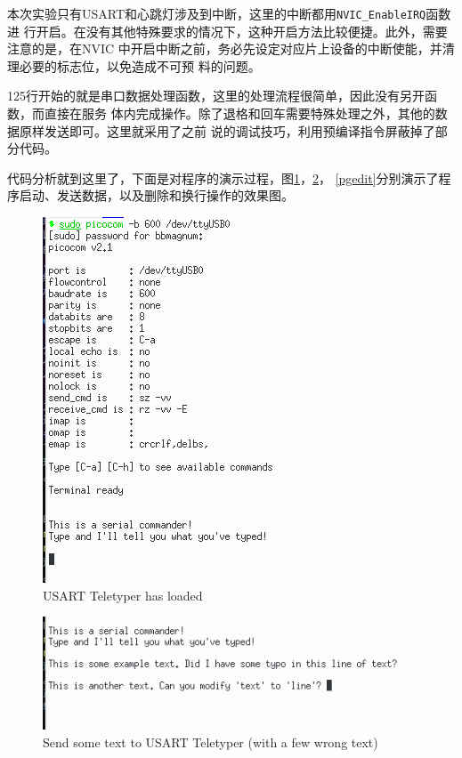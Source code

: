 \documentclass[a4paper]{ctexart}
\begin{document}
本次实验只有USART和心跳灯涉及到中断，这里的中断都用\lstinline{NVIC_EnableIRQ}函数进
行开启。在没有其他特殊要求的情况下，这种开启方法比较便捷。此外，需要注意的是，在NVIC
中开启中断之前，务必先设定对应片上设备的中断使能，并清理必要的标志位，以免造成不可预
料的问题。

125行开始的就是串口数据处理函数，这里的处理流程很简单，因此没有另开函数，而直接在服务
体内完成操作。除了退格和回车需要特殊处理之外，其他的数据原样发送即可。这里就采用了之前
说的调试技巧，利用预编译指令屏蔽掉了部分代码。

代码分析就到这里了，下面是对程序的演示过程，图\ref{pgload}，\ref{pgsend}，
\ref{pgedit}分别演示了程序启动、发送数据，以及删除和换行操作的效果图。

\begin{figure}[h]
  \centering\includegraphics{./img/pgload.png}
  \caption{USART Teletyper has loaded}\label{pgload}
\end{figure}
\begin{figure}[h]
  \centering\includegraphics{./img/pgsend.png}
  \caption{Send some text to USART Teletyper (with a few wrong text)}\label{pgsend}
\end{figure}
\end{document}
